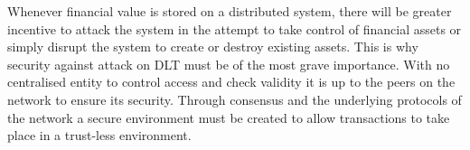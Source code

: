 Whenever financial value is stored on a distributed system, there will be greater incentive to attack the system in the attempt to take control of financial assets or simply disrupt the system to create or destroy existing assets. This is why security against attack on DLT must be of the most grave importance. With no centralised entity to control access and check validity it is up to the peers on the network to ensure its security. Through consensus and the underlying protocols of the network a secure environment must be created to allow transactions to take place in a trust-less environment. 